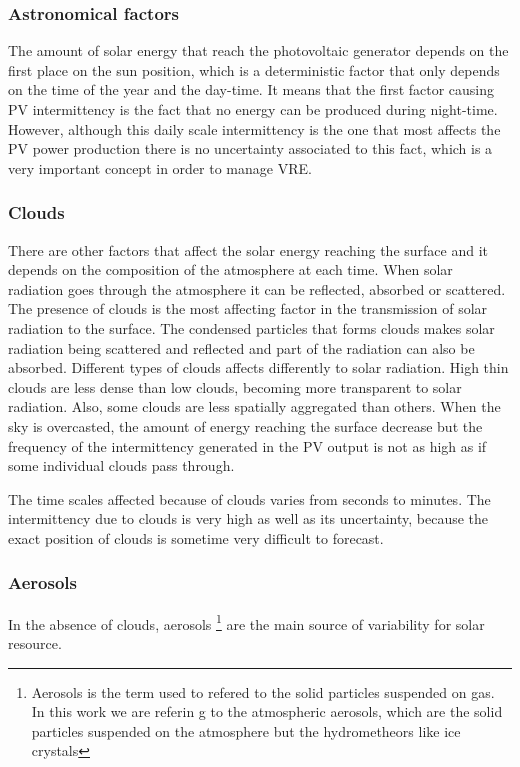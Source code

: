 \subsubsection{Astronomical factors}

The amount of solar energy that reach the photovoltaic generator depends on the first place on the sun position, which is a deterministic factor that only depends on the time of the year and the day-time. It means that the first factor causing PV intermittency is the fact that no energy can be produced during night-time. However, although this daily scale intermittency is the one that most affects the PV power production there is no uncertainty associated to this fact, which is a very important concept in order to manage VRE.

\subsubsection{Clouds}

There are other factors that affect the solar energy reaching the surface and it depends on the composition of the atmosphere at each time. When solar radiation goes through the atmosphere it can be reflected, absorbed or scattered. The presence of clouds is the most affecting factor in the transmission of solar radiation to the surface. The condensed particles that forms clouds makes solar radiation being scattered and reflected and part of the radiation can also be absorbed. Different types of clouds affects differently to solar radiation. High thin clouds are less dense than low clouds, becoming more transparent to solar radiation. Also, some clouds are less spatially aggregated than others. When the sky is overcasted, the amount of energy reaching the surface decrease but the frequency of the intermittency generated in the PV output is not as high as if some individual clouds pass through.

The time scales affected because of clouds varies from seconds to minutes. The intermittency due to clouds is very high as well as its uncertainty, because the exact position of clouds is sometime very difficult to forecast.

\subsubsection{Aerosols}

In the absence of clouds, aerosols \footnote{Aerosols is the term used to refered to the solid particles suspended on gas. In this work we are referin g to the atmospheric aerosols, which are the solid particles suspended on the atmosphere but the hydrometheors like ice crystals} are the main source of variability for solar resource. 

